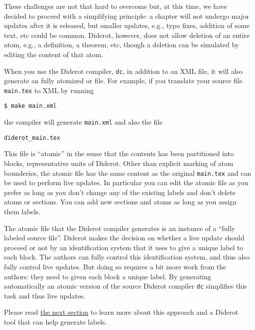 \begin{gram}
These challenges are not that hard to overcome but, at this time, we have decided to proceed with a simplifying principle: a chapter will not undergo major updates after it is released, but smaller updates, e.g., typo fixes, addition of some text, etc could be common. 
%
Diderot, however, does not allow deletion of an entire atom, e.g., a definition, a theorem, etc, though a deletion can be simulated by editing the content of that atom.
\end{gram}

\begin{gram}
\label{grm:publisg::diderot-atomic}
When you use the Diderot compiler, \lstinline`dc`, in addition to an XML file, it will also generate an fully atomized or  file.  For example, if you translate your source file \lstinline`main.tex` to XML by running

\lstinline`$ make main.xml`

the compiler will generate \lstinline`main.xml` and also the file 

\lstinline`diderot_main.tex`

This file is ``atomic'' in the sense that the contents has been partitioned into  blocks, representative units of Diderot.
%
Other than explicit marking of atom bounderies, the atomic file has the same content as the original \lstinline`main.tex`
%
and can be used to perform live updates. 
%
In particular you can edit the atomic file as you prefer as long as you don't change any of the existing labels and don't delete atoms or sections.  You can add new sections and atoms as long as you assign them labels.
 
\end{gram}


\begin{gram}
%
The atomic file that the Diderot compiler generates is an instance of a ``fully labeled source file''.
%
Diderot makes the decision on whether a live update should proceed or not by an identification system that it uses to give a unique label to each block.
%
The authors can fully control this identification system, and thus also fully control live updates.
%
But doing so requires a bit more work from the authors: they need to given each block a unique label.
%
By generating automatically an atomic version of the source Diderot compiler \lstinline`dc` simplifies this task and thus live updates.
%

Please read 
%
\href{sec:publish::full-labeling}{the next section}
%
to learn more about this approach and a Diderot tool that can help generate labels.
\end{gram}


